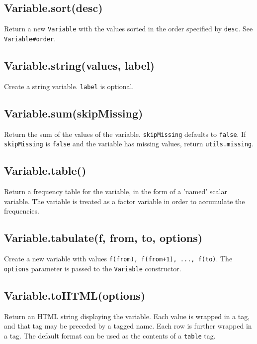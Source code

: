 \documentclass{article}
\begin{document}
    \subsection*{Variable.sort(desc)}
    Return a new \texttt{Variable} with the values sorted in the order specified by \texttt{desc}.
See \texttt{Variable\#order}.


    \subsection*{Variable.string(values, label)}
    Create a string variable. \texttt{label} is optional.


    \subsection*{Variable.sum(skipMissing)}
    Return the sum of the values of the variable.
\texttt{skipMissing} defaults to \texttt{false}.  If \texttt{skipMissing} is \texttt{false} and
the variable has missing values, return \texttt{utils.missing}.


    \subsection*{Variable.table()}
    Return a frequency table for the variable, in the form of a 'named' scalar
variable.  The variable is treated as a factor variable in order to
accumulate the frequencies.


    \subsection*{Variable.tabulate(f, from, to, options)}
    Create a new variable with values \texttt{f(from), f(from+1), ..., f(to)}.
The \texttt{options} parameter is passed to the \texttt{Variable} constructor.


    \subsection*{Variable.toHTML(options)}
    Return an HTML string displaying the variable. Each value is wrapped in
a tag, and that tag may be preceded by a tagged name. Each row is further
wrapped in a tag. The default format can be used as the contents of a
\texttt{table} tag.
\end{document}
